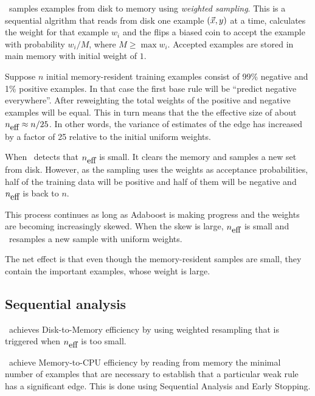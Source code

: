 \Sparrow\ samples examples from disk to memory using {\em weighted
  sampling}. This is a sequential algrithm that reads from disk one
example $(\vec{x},y)$ at a time, calculates the weight for that example
$w_i$ and the flips a biased coin to accept the example with
probability $w_i/M$, where $M\geq \max w_i$. Accepted examples are
stored in main memory with initial weight of $1$.

Suppose $n$ initial memory-resident training examples consist of 99\%
negative and 1\% positive examples. In that case the first base rule
will be ``predict negative everywhere''. After reweighting the total
weights of the positive and negative examples will be equal. This in
turn means that the the effective size of about ${n_{\mbox{eff}}} \approx
n/25$. In other words, the variance of estimates of the edge has
increased by a factor of 25 relative to the initial uniform weights.

When \Sparrow\ detects that ${n_{\mbox{eff}}}$ is small. It clears the memory and
samples a new set from disk. However, as the sampling uses the weights
as acceptance probabilities, half of the training data will be
positive and half of them will be negative and ${n_{\mbox{eff}}}$ is back to $n$.

This process continues as long as Adaboost is making progress and the
weights are becoming increasingly skewed. When the skew is large,
${n_{\mbox{eff}}}$ is small and \Sparrow\ resamples a new sample with uniform
weights.

The net effect is that even though the memory-resident samples are
small, they contain the important examples, whose weight is large.


\subsection{Sequential analysis}

\Sparrow\ achieves Disk-to-Memory efficiency by using weighted
resampling that is triggered when ${n_{\mbox{eff}}}$ is too small.

\Sparrow\ achieve Memory-to-CPU efficiency by reading from memory the
minimal number of examples that are necessary to establish that a
particular weak rule has a significant edge. This is done using
Sequential Analysis and Early Stopping.

